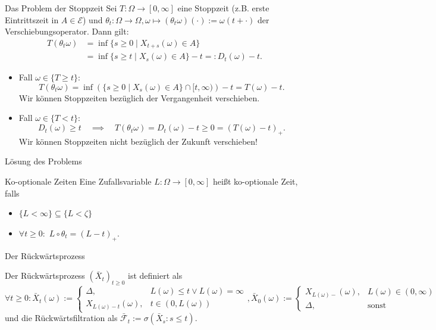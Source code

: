 \documentclass[11pt,aspectratio=169]{beamer}
\begin{document}
\begin{frame}{Das Problem der Stoppzeit}\tiny
Sei $T: \Omega \to [0,\infty]$ eine Stoppzeit (z.B. erste Eintrittszeit in $A \in \mathcal{E}$) und $\theta_t : \Omega \to \Omega, \omega \mapsto (\theta_t \omega)(\cdot) := \omega(t+\cdot)$ der Verschiebungsoperator. Dann gilt:
\begin{align*}
T(\theta_t \omega) &= \inf \{ s\geq 0 \mid X_{t+s} (\omega)\in A \} \\
&= \inf \{ s \geq t \mid X_s (\omega) \in A \} - t =: D_t(\omega) - t.
\end{align*}
\begin{itemize}
  \item Fall $\omega \in \{ T \geq t \}$: 
  \[
  T(\theta_t \omega) = \inf \left( \{ s \geq 0 \mid X_s(\omega) \in A \} \cap [t,\infty) \right) - t = T(\omega) - t.
  \]
  Wir können Stoppzeiten bezüglich der Vergangenheit verschieben.
  \item Fall $\omega \in \{ T < t \}$:
  \[
  D_t (\omega) \geq t \quad \implies \quad T(\theta_t \omega) = D_t(\omega) - t \geq 0 = (T(\omega)-t)_+.
  \]
   Wir können Stoppzeiten nicht bezüglich der Zukunft verschieben!
\end{itemize}
\end{frame}

\begin{frame}{Lösung des Problems}
  
  \begin{block}{Ko-optionale Zeiten}
    Eine Zufallsvariable $L: \Omega \to [0,\infty]$ heißt ko-optionale Zeit, falls 
    \begin{itemize}
      \item $\{L < \infty \} \subseteq \{L < \zeta\}$
      \item $\forall t \geq 0:$ $L \circ \theta_t = (L-t)_+$.
    \end{itemize}
  \end{block}
\end{frame}


\begin{frame}{Der Rückwärtsprozess}\small

Der Rückwärtsprozess $(\bar{X}_t)_{t \geq 0}$ ist definiert als 
\[
\forall t \geq 0:  \bar{X}_t (\omega) := \begin{cases}
  \Delta, & L(\omega) \leq t \vee L(\omega) =\infty \\
  X_{L(\omega)-t} (\omega), & t \in (0,L(\omega))
\end{cases}, \bar{X}_0(\omega) := \begin{cases}
  X_{L(\omega)-}(\omega), & L(\omega) \in (0,\infty)\\
  \Delta, & \text{sonst}
\end{cases}
\]
und die Rückwärtsfiltration als $\bar{\mathcal{F}}_t := \sigma (\bar{X}_s : s \leq t)$.
\end{frame}
\end{document}
